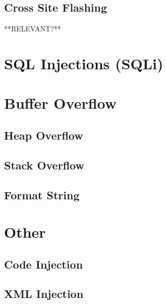 	\subsection{Cross Site Flashing}
	**RELEVANT?**

\section{SQL Injections (SQLi)}
	


\section{Buffer Overflow}

	\subsection{Heap Overflow}

	\subsection{Stack Overflow}

	\subsection{Format String}

\section{Other}

	\subsection{Code Injection}

	\subsection{XML Injection}

